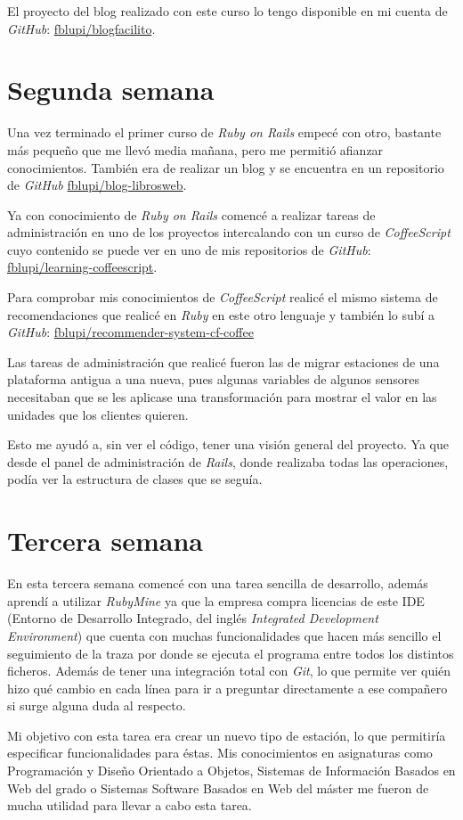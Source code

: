 El proyecto del blog realizado con este curso lo tengo disponible en mi cuenta de \textit{GitHub}: \href{https://github.com/fblupi/blogfacilito}{fblupi/blogfacilito}.

\section{Segunda semana}

Una vez terminado el primer curso de \textit{Ruby on Rails} empecé con otro, bastante más pequeño que me llevó media mañana, pero me permitió afianzar conocimientos. También era de realizar un blog y se encuentra en un repositorio de \textit{GitHub} \href{https://github.com/fblupi/blog-librosweb}{fblupi/blog-librosweb}.

Ya con conocimiento de \textit{Ruby on Rails} comencé a realizar tareas de administración en uno de los proyectos intercalando con un curso de \textit{CoffeeScript} cuyo contenido se puede ver en uno de mis repositorios de \textit{GitHub}: \href{https://github.com/fblupi/learning-coffeescript}{fblupi/learning-coffeescript}.

Para comprobar mis conocimientos de \textit{CoffeeScript} realicé el mismo sistema de recomendaciones que realicé en \textit{Ruby} en este otro lenguaje y también lo subí a \textit{GitHub}: \href{https://github.com/fblupi/recommender-system-cf-coffee}{fblupi/recommender-system-cf-coffee}

Las tareas de administración que realicé fueron las de migrar estaciones de una plataforma antigua a una nueva, pues algunas variables de algunos sensores necesitaban que se les aplicase una transformación para mostrar el valor en las unidades que los clientes quieren.

Esto me ayudó a, sin ver el código, tener una visión general del proyecto. Ya que desde el panel de administración de \textit{Rails}, donde realizaba todas las operaciones, podía ver la estructura de clases que se seguía.

\section{Tercera semana}

En esta tercera semana comencé con una tarea sencilla de desarrollo, además aprendí a utilizar \textit{RubyMine} ya que la empresa compra licencias de este IDE (Entorno de Desarrollo Integrado, del inglés \textit{Integrated Development Environment}) que cuenta con muchas funcionalidades que hacen más sencillo el seguimiento de la traza por donde se ejecuta el programa entre todos los distintos ficheros. Además de tener una integración total con \textit{Git}, lo que permite ver quién hizo qué cambio en cada línea para ir a preguntar directamente a ese compañero si surge alguna duda al respecto.

Mi objetivo con esta tarea era crear un nuevo tipo de estación, lo que permitiría especificar funcionalidades para éstas. Mis conocimientos en asignaturas como Programación y Diseño Orientado a Objetos, Sistemas de Información Basados en Web del grado o Sistemas Software Basados en Web del máster me fueron de mucha utilidad para llevar a cabo esta tarea.

